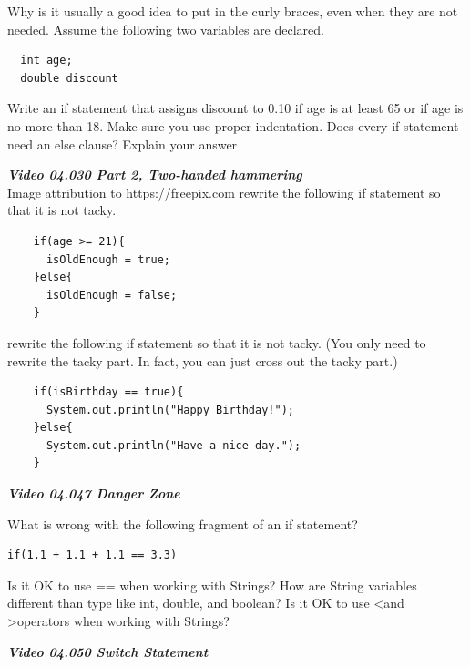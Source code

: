 \documentclass[letterpaper,11pt]{exam}
\newcommand{\videoheading}[1]{\Large\textbf{\textit{#1}}}
\begin{document}
\begin{questions}
\question Why is it usually a good idea to put in the curly braces, even when they are not needed.
\vspace{1.cm}
\question Assume the following two variables are declared.
\begin{verbatim}
  int age;
  double discount
\end{verbatim}
Write an if statement that assigns discount to 0.10 if age is at least 65 or if age is no more than 18.  Make sure you use proper indentation.
\vspace{3.cm}
\question Does every if statement need an else clause?  Explain your answer
\vspace{1.5cm}


\begin{minipage}{\textwidth}
  \videoheading{Video 04.030 Part 2, Two-handed hammering}\\
  Image attribution to https://freepix.com
  \question rewrite the following if statement so that it is not tacky.
  \begin{verbatim}
    if(age >= 21){
      isOldEnough = true;
    }else{
      isOldEnough = false;
    }
  \end{verbatim}
\end{minipage}
\begin{minipage}{\textwidth}
  \question rewrite the following if statement so that it is not tacky. (You only need to rewrite the tacky part.  In fact, you can just cross out the tacky part.)
  \begin{verbatim}
    if(isBirthday == true){
      System.out.println("Happy Birthday!");
    }else{
      System.out.println("Have a nice day.");
    }
  \end{verbatim}
\end{minipage}

\videoheading{Video 04.047 Danger Zone}

\question What is wrong with the following fragment of an if statement?
\begin{verbatim}
if(1.1 + 1.1 + 1.1 == 3.3)
\end{verbatim}
\question Is it OK to use == when working with Strings?  How are String variables different than type like int, double, and boolean?
\vspace{1cm}
\question Is it OK to use \textless and \textgreater operators when working with Strings?

\videoheading{Video 04.050 Switch Statement}


\end{questions}
\end{document}
